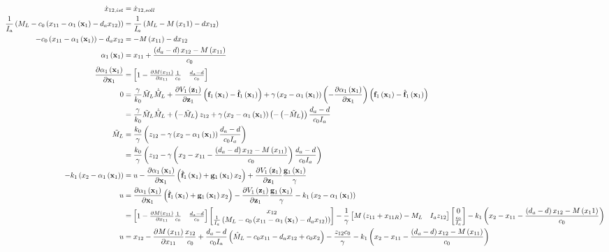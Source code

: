 \documentclass[10pt,a3paper,landscape]{article}
\begin{document}
\begin{align}
	\dot{x}_{12,ist}&=\dot{x}_{12,soll}\\
	\frac{1}{I_a}\mybr{M_L-c_0\mybr{x_{11}-\alphae-d_a x_{12}}}&=\frac{1}{I_a}\mybr{M_L-M\mybr{x_11}-d x_{12}}\\
	-c_0\mybr{x_{11}-\alphae}-d_a x_{12}&=-M\mybr{x_{11}}-d x_{12}\\
	\alphae&=x_{11}+\frac{\mybr{d_a-d}x_{12}-M\mybr{x_{11}}}{c_0}\\
	\dadxe&=\begin{bmatrix}1-\frac{\partial M\mybr{x_{11}}}{\partial x_{11}} \frac{1}{c_0} & \frac{d_a-d}{c_0}\end{bmatrix}\\
	0&=\frac{\gamma}{k_0}\mls\mlsp+\dVedze\mybr{\fe-\fed}+\gamma\mybr{x_2-\alphae}\mybr{-\dadxe}\mybr{\fe-\fed}\\
	&=\frac{\gamma}{k_0}\mls\mlsp+\mybr{-\mls}z_{12}+\gamma\mybr{x_2-\alphae}\mybr{-\mybr{-\mls}}\frac{d_a-d}{c_0I_a}\\
	\mls&=\frac{k_0}{\gamma}\mybr{z_{12}-\gamma\mybr{x_2-\alphae}\frac{d_a-d}{c_0 I_a}}\\
	&=\frac{k_0}{\gamma}\mybr{z_{12}-\gamma\mybr{x_2-x_{11}-\frac{\mybr{d_a-d}x_{12}-M\mybr{x_{11}}}{c_0}}\frac{d_a-d}{c_0 I_a}}\\
	-k_1\mybr{x_2-\alphae}&=u-\dadxe\mybr{\fed+\ge x_2}+\dVedze \frac{\ge}{\gamma}\\
	u&=\dadxe\mybr{\fed+\ge x_2}-\dVedze \frac{\ge}{\gamma}-k_1\mybr{x_2-\alphae}\\
	&=\begin{bmatrix}1-\frac{\partial M\mybr{x_{11}}}{\partial x_{11}} \frac{1}{c_0} & \frac{d_a-d}{c_0}\end{bmatrix}\begin{bmatrix}x_{12}\\
	\frac{1}{I_a}\mybr{M_L-c_0\mybr{x_{11}-\alphae-d_a x_{12}}}
	\end{bmatrix}-\frac{1}{\gamma}\begin{bmatrix}M\mybr{z_{11}+x_{11R}}-M_L & I_a z_{12}\end{bmatrix}\begin{bmatrix}
	0\\\frac{c_0}{I_a}
	\end{bmatrix}-k_1\mybr{x_2-x_{11}-\frac{\mybr{d_a-d}x_{12}-M\mybr{x_11}}{c_0}}\\
	u&=x_{12}-\frac{\partial M\mybr{x_{11}}}{\partial x_{11}}\frac{x_{12}}{c_0}+\frac{d_a-d}{c_0 I_a}\mybr{\mld-c_0 x_{11}-d_a x_{12}+c_0 x_2}-\frac{z_{12} c_0}{\gamma}-k_1\mybr{x_2-x_{11}-\frac{\mybr{d_a-d}x_{12}-M\mybr{x_{11}}}{c_0}}
\end{align}
\end{document}
